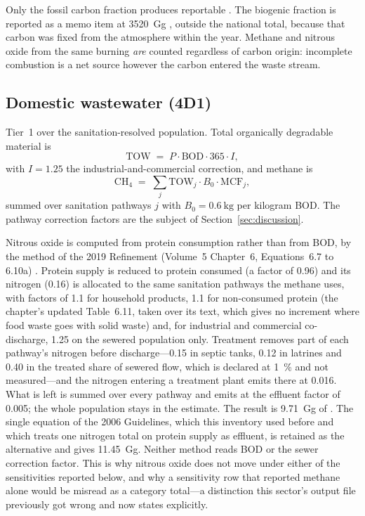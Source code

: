 Only the fossil carbon fraction produces reportable \COtwo{}. The biogenic fraction is
reported as a memo item at \SI{3520}{\giga\gram} \COtwo{}, outside the national total, because
that carbon was fixed from the atmosphere within the year. Methane and nitrous oxide from the
same burning \emph{are} counted regardless of carbon origin: incomplete combustion is a net
source however the carbon entered the waste stream.

\subsection{Domestic wastewater (4D1)}

Tier~1 over the sanitation-resolved population. Total organically degradable material is
\begin{equation}
\mathrm{TOW} \;=\; P \cdot \mathrm{BOD} \cdot 365 \cdot I,
\end{equation}
with $I = \num{1.25}$ the industrial-and-commercial correction, and methane is
\begin{equation}
\mathrm{CH_4} \;=\; \sum_{j} \mathrm{TOW}_{j} \cdot B_{0} \cdot \mathrm{MCF}_{j},
\end{equation}
summed over sanitation pathways $j$ with $B_0 = \SI{0.6}{\kilo\gram}$ \CHfour{} per kilogram
BOD. The pathway correction factors are the subject of Section~\ref{sec:discussion}.

Nitrous oxide is computed from protein consumption rather than from BOD, by the method of
the 2019 Refinement (Volume~5 Chapter~6, Equations~6.7 to 6.10a) \citep{ipcc2019}. Protein
supply is reduced to protein consumed (a factor of \num{0.96}) and its nitrogen (\num{0.16})
is allocated to the same sanitation pathways the methane uses, with factors of \num{1.1} for
household products, \num{1.1} for non-consumed protein (the chapter's updated Table~6.11,
taken over its text, which gives no increment where food waste goes with solid waste) and,
for industrial and commercial co-discharge, \num{1.25} on the sewered population only.
Treatment removes part of each pathway's nitrogen before discharge---\num{0.15} in septic
tanks, \num{0.12} in latrines and \num{0.40} in the treated share of sewered flow, which is
declared at \SI{1}{\percent} and not measured---and the nitrogen entering a treatment plant
emits there at \num{0.016}. What is left is summed over every pathway and emits at the
effluent factor of \num{0.005}; the whole population stays in the estimate. The result is
\SI{9.71}{\giga\gram} of \NtwoO{}. The single equation of the 2006 Guidelines, which this
inventory used before and which treats one nitrogen total on protein supply as effluent,
is retained as the alternative and gives \SI{11.45}{\giga\gram}. Neither method reads BOD or
the sewer correction factor. This is why nitrous oxide does not move under either of the
sensitivities reported below, and why a sensitivity row that reported methane alone would be
misread as a category total---a distinction this sector's output file previously got wrong
and now states explicitly.
